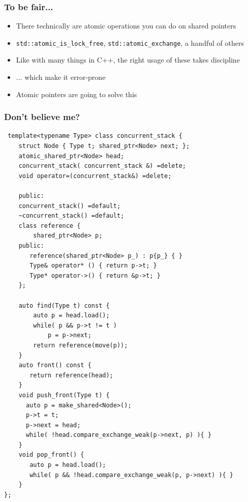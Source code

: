 \documentclass{beamer}
\begin{document}
\begin{frame}
\frametitle{To be fair...}
\begin{itemize}
\setlength\itemsep{2em}
\item There technically are atomic operations you can do on shared pointers
\item \texttt{std::atomic\_is\_lock\_free}, \texttt{std::atomic\_exchange}, a handful of others
\item Like with many things in C++, the right usage of these takes discipline
\item ... which make it error-prone
\item Atomic pointers are going to solve this
\end{itemize}
\end{frame}

\begin{frame}[fragile]
\frametitle{Don't believe me?}

\begin{multicols}{2}
\begin{lstlisting}
 template<typename Type> class concurrent_stack {
    struct Node { Type t; shared_ptr<Node> next; };
    atomic_shared_ptr<Node> head;
    concurrent_stack( concurrent_stack &) =delete;
    void operator=(concurrent_stack&) =delete;
    
    public:
    concurrent_stack() =default;
    ~concurrent_stack() =default;
    class reference {
        shared_ptr<Node> p;
    public:
       reference(shared_ptr<Node> p_) : p{p_} { }
       Type& operator* () { return p->t; }
       Type* operator->() { return &p->t; }
    };
    
    auto find(Type t) const {
        auto p = head.load();  
        while( p && p->t != t )
            p = p->next;
        return reference(move(p));
    }
    auto front() const {
       return reference(head); 
    }
    void push_front(Type t) {
      auto p = make_shared<Node>();
      p->t = t;
      p->next = head;         
      while( !head.compare_exchange_weak(p->next, p) ){ }
    }
    void pop_front() {
       auto p = head.load();
       while( p && !head.compare_exchange_weak(p, p->next) ){ }
    }
};

\end{lstlisting}
\columnbreak
\end{multicols}
\end{frame}
\end{document}
